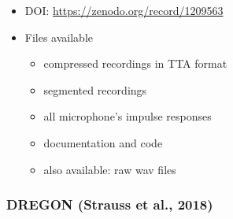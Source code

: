 \documentclass[14pt, oneside]{extarticle}
\begin{document}
\begin{itemize}
\item DOI: \href{10.5281/zenodo.1209563}{https://zenodo.org/record/1209563} 

\item Files available
	\begin{itemize}
	\item compressed recordings in TTA format
	\item segmented recordings
	\item all microphone's impulse responses
	\item documentation and code
	\item also available: raw wav files
	\end{itemize}

\end{itemize}

\subsubsection{DREGON (Strauss et al., 2018)}
\end{document}
